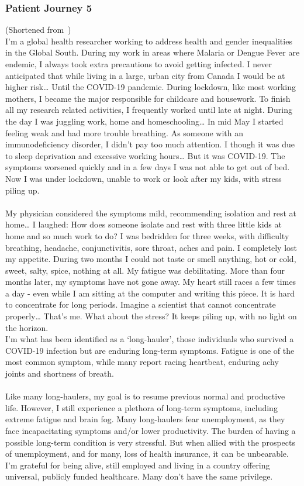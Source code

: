 \subsubsection{Patient Journey 5}\label{apx:pj5} (Shortened from~\cite{malta_my_2020})\\
I'm a global health researcher working to address health and gender inequalities in the Global South. During my work in areas where Malaria or Dengue Fever are endemic, I always took extra precautions to avoid getting infected. I never anticipated that while living in a large, urban city from Canada I would be at higher risk… Until the COVID-19 pandemic.
During lockdown, like most working mothers, I became the major responsible for childcare and housework. To finish all my research related activities, I frequently worked until late at night. During the day I was juggling work, home and homeschooling… In mid May I started feeling weak and had more trouble breathing. As someone with an immunodeficiency disorder, I didn't pay too much attention. I though it was due to sleep deprivation and excessive working hours… But it was COVID-19. The symptoms worsened quickly and in a few days I was not able to get out of bed. Now I was under lockdown, unable to work or look after my kids, with stress piling up.\\\\
My physician considered the symptoms mild, recommending isolation and rest at home… I laughed: How does someone isolate and rest with three little kids at home and so much work to do? I was bedridden for three weeks, with difficulty breathing, headache, conjunctivitis, sore throat, aches and pain. I completely lost my appetite. During two months I could not taste or smell anything, hot or cold, sweet, salty, spice, nothing at all. My fatigue was debilitating. More than four months later, my symptoms have not gone away. My heart still races a few times a day - even while I am sitting at the computer and writing this piece. It is hard to concentrate for long periods. Imagine a scientist that cannot concentrate properly… That's me. What about the stress? It keeps piling up, with no light on the horizon.\\
I'm what has been identified as a ‘long-hauler’, those individuals who survived a COVID-19 infection but are enduring long-term symptoms. Fatigue is one of the most common symptom, while many report racing heartbeat, enduring achy joints and shortness of breath.\\\\
Like many long-haulers, my goal is to resume previous normal and productive life. However, I still experience a plethora of long-term symptoms, including extreme fatigue and brain fog. Many long-haulers fear unemployment, as they face incapacitating symptoms and/or lower productivity. The burden of having a possible long-term condition is very stressful. But when allied with the prospects of unemployment, and for many, loss of health insurance, it can be unbearable. I'm grateful for being alive, still employed and living in a country offering universal, publicly funded healthcare. Many don't have the same privilege.
\newpage
